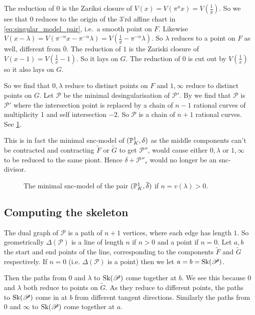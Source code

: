 The reduction of $0$ is the Zariksi closure of $V(x) = V(\pi ^{n} x ) = V(\frac{1}{y})$. 
So we see that $0$ reduces to the origin of the 3'rd affine chart in \eqref{eq:singular_model_pair}, i.e.\ a smooth point on $F$. 
Likewise  $V(x - \lambda) = V(\pi^{-n} x - \pi^{-n}\lambda) = V(\frac{1}{y} - \pi^{-n}\lambda)$. 
So $\lambda$ reduces to a point on $F$ as well, different from $\overline{0}$.
The reduction of $1$ is the Zariski closure of $V(x-1) = V(\frac{1}{x} - 1)$. 
So it lays on $G$. The reduction of $0$ is cut out by $V(\frac{1}{x})$ so it also lays on $G$. 

So we find that $0, \lambda$ reduce to distinct points on $F$ and $1, \infty$ reduce to distinct points on $G$. 
Let $\mathscr P$ be the minimal desingularisation of $\mathscr P'$. 
By \cite[cor.\ 9.3.25]{liuAlgebraicGeometryArithmetic2002} we find that $\mathscr P$ is $\mathscr P'$ where the intersection point is replaced by a chain of $n-1$ rational curves of multiplicity 1 and self intersection $-2$.  
So $\mathscr P$ is a chain of $n + 1$ rational curves. See \cref{fig:model_of_the_pair}. 

This is in fact the minimal snc-model of $(\mathbb{P}^{1}_K, \delta)$ as the middle components can't be contracted and contracting $\tilde F$ or $\tilde G$ to get $\mathscr P''$, would cause either $0, \lambda$ or $1, \infty$ to be reduced to the same piont. Hence $\delta + \mathscr P''_s$ would no longer be an snc-divisor. 
\begin{figure}[h]
    \centering
    \caption{The minimal snc-model of the pair $(\mathbb{P}^{1}_K, \overline{\delta})$ if $n =v(\lambda) > 0$. }
    \label{fig:model_of_the_pair}
\end{figure}

\subsection{Computing the skeleton} \label{sec:computing_the_skeleton}

The dual graph of $\mathscr P$ is a path of $n + 1$ vertices, where each edge has length $1$. 
So geometrically $\Delta(\mathscr P)$ is a line of length $n$ if $n > 0$ and a point if $n = 0$.
Let $a, b$ the start and end points of the line, corresponding to the components $\tilde F$ and $\tilde G$ respectively. If $n = 0$ (i.e. $\Delta(\mathscr P)$ is a point) then we let $a = b = \operatorname{Sk}(\mathscr P)$. 

Then the paths from $0$ and  $\lambda$ to $\operatorname{Sk}(\mathscr P)$ come together at $b$. We see this because $0$ and $\lambda$ both reduce to points on $\tilde G$. 
As they reduce to different points, the paths to $\operatorname{Sk}(\mathscr P)$ come in at $b$ from different tangent directions. 
Similarly the paths from $0$ and $\infty$ to $\operatorname{Sk}(\mathscr P)$ come together at $a$.

